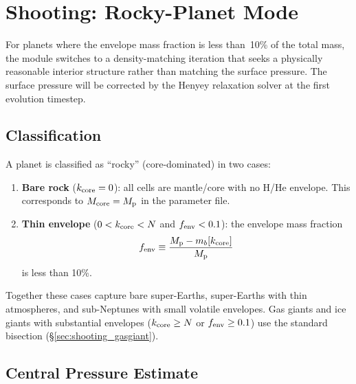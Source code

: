 \documentclass{aastex631}
\newcommand{\Mpl}{M_{\rm p}}
\begin{document}
\section{Shooting: Rocky-Planet Mode}\label{sec:shooting_rocky}

For planets where the envelope mass fraction is less than~10\% of the
total mass, the module switches to a density-matching iteration that
seeks a physically reasonable interior structure rather than matching
the surface pressure.  The surface pressure will be corrected by the
Henyey relaxation solver at the first evolution timestep.

\subsection{Classification}\label{sec:classification}

A planet is classified as ``rocky'' (core-dominated) in two cases:
\begin{enumerate}
  \item \textbf{Bare rock} ($k_{\rm core} = 0$): all cells are
    mantle/core with no H/He envelope.  This corresponds to
    $M_{\rm core} = \Mpl$ in the parameter file.
  \item \textbf{Thin envelope} ($0 < k_{\rm core} < N$ and
    $f_{\rm env} < 0.1$): the envelope mass fraction
    \begin{equation}\label{eq:rocky_criterion}
      f_{\rm env} \equiv \frac{\Mpl - m_b[k_{\rm core}]}{\Mpl}
    \end{equation}
    is less than 10\%.
\end{enumerate}
Together these cases capture bare super-Earths, super-Earths with thin
atmospheres, and sub-Neptunes with small volatile envelopes.  Gas giants
and ice giants with substantial envelopes ($k_{\rm core} \geq N$ or
$f_{\rm env} \geq 0.1$) use the standard bisection
(\S\ref{sec:shooting_gasgiant}).

\subsection{Central Pressure Estimate}
\end{document}

